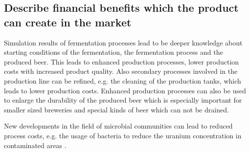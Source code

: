 
\subsection*{Describe financial benefits which the product can create in the market}

Simulation results of fermentation processes lead to be deeper knowledge about starting conditions of the fermentation, the fermentation
process and the produced beer. This leads to enhanced production processes, lower production costs with increased product quality.
Also secondary processes involved in the production line can be refined, e.g. the cleaning of the production tanks, which leads to lower
production costs. Enhanced production processes can also be used to enlarge the durability of the produced beer which is especially
important for smaller sized breweries and special kinds of beer which can not be drained.

New developments in the field of microbial communities can lead to reduced process costs, e.g. the usage of bacteria to reduce the uranium
concentration in contaminated areas \cite{zhuang2011genome}.



